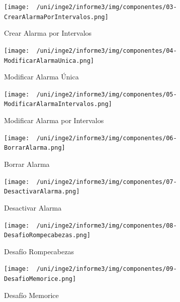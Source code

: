\begin{figure}[H]
	\centering
	\texttt{[image: ~/uni/inge2/informe3/img/componentes/03-CrearAlarmaPorIntervalos.png]}
	\caption{Crear Alarma por Intervalos}
        \vspace{5pt}
	\label{fig:Crear Alarma por Intervalos}
\end{figure}

\begin{figure}[H]
	\centering
	\texttt{[image: ~/uni/inge2/informe3/img/componentes/04-ModificarAlarmaUnica.png]}
	\caption{Modificar Alarma Única}
        \vspace{5pt}
	\label{fig:Modificar Alarma Única}
\end{figure}

\begin{figure}[H]
	\centering
	\texttt{[image: ~/uni/inge2/informe3/img/componentes/05-ModificarAlarmaIntervalos.png]}
	\caption{Modificar Alarma por Intervalos}
        \vspace{5pt}
	\label{fig:Modificar Alarma por Intervalos}
\end{figure}

\begin{figure}[H]
	\centering
	\texttt{[image: ~/uni/inge2/informe3/img/componentes/06-BorrarAlarma.png]}
	\caption{Borrar Alarma}
        \vspace{5pt}
	\label{fig:Borrar Alarma}
\end{figure}

\begin{figure}[H]
	\centering
	\texttt{[image: ~/uni/inge2/informe3/img/componentes/07-DesactivarAlarma.png]}
	\caption{Desactivar Alarma}
        \vspace{5pt}
	\label{fig:Desactivar Alarma}
\end{figure}

\begin{figure}[H]
	\centering
	\texttt{[image: ~/uni/inge2/informe3/img/componentes/08-DesafioRompecabezas.png]}
	\caption{Desafío Rompecabezas}
        \vspace{5pt}
	\label{fig:Desafío Rompecabezas}
\end{figure}

\begin{figure}[H]
	\centering
	\texttt{[image: ~/uni/inge2/informe3/img/componentes/09-DesafioMemorice.png]}
	\caption{Desafío Memorice}
        \vspace{5pt}
	\label{fig:Desafío Memorice}
\end{figure}

